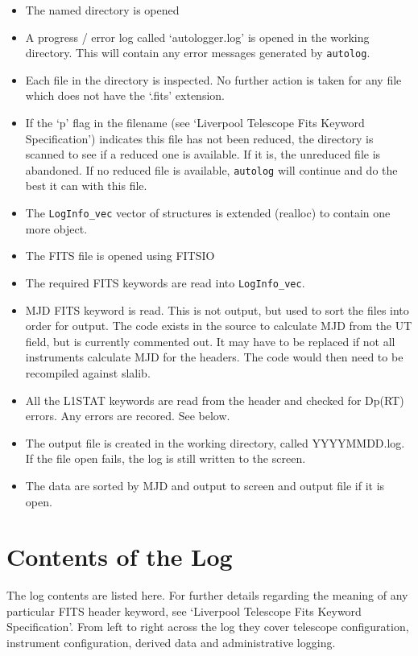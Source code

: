 \documentclass[10pt,a4paper]{article}
\begin{document}
\begin{itemize}
\item The named directory is opened
\item A progress / error log called `autologger.log' is opened in the working directory. This will contain any error messages generated by {\tt autolog}. 
\item Each file in the directory is inspected. No further action is taken 
for any file which does not have the `.fits' extension.
\item If the `p' flag in the filename (see `Liverpool Telescope 
Fits Keyword Specification') indicates this file has not been reduced, 
the directory is scanned to see if a reduced one is available. If it is,
the unreduced file is abandoned. If no reduced file is available, 
{\tt autolog} will continue and do the best it can with this file.
\item The {\tt LogInfo\_vec} vector of structures is extended (realloc) 
to contain one more object.
\item The FITS file is opened using FITSIO
\item The required FITS keywords are read into {\tt LogInfo\_vec}.
\item MJD FITS keyword is read. This is not output, but used to sort
the files into order for output. The code exists in the source to 
calculate MJD from the UT field, but is currently commented out. It may
have to be replaced if not all instruments calculate MJD for the headers.
The code would then need to be recompiled against slalib.
\item All the L1STAT keywords are read from the header and checked
for Dp(RT) errors. Any errors are recored. See below.
\item The output file is created in the working directory, called YYYYMMDD.log.
If the file open fails, the log is still written to the screen.
\item The data are sorted by MJD and output to screen and output file
if it is open.
\end{itemize}



\section{Contents of the Log}
The log contents are listed here. For further details regarding
the meaning of any particular FITS header keyword, see `Liverpool
Telescope Fits Keyword Specification'. From left to right across
the log they cover telescope configuration, instrument configuration,
derived data and administrative logging.
\end{document}
